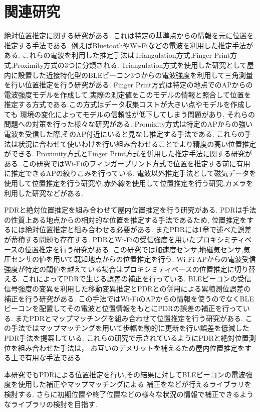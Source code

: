 

\section{関連研究}
絶対位置推定に関する研究がある.
これは特定の基準点からの情報を元に位置を推定する手法である.
例えばBluetoothやWi-Fiなどの電波を利用した推定手法がある.
これらの電波を利用した推定手法はTriangulation方式,Finger Print方式,Proximity方式の3つに分類される.\cite{wireless-lan-summary}
Triangulation方式を使用した研究として屋内に設置した近接特化型のBLEビーコン3つからの電波強度を利用して三角測量を行い位置推定を行う研究がある.\cite{ble-indoor}\cite{ble-tandem}\cite{triangulation-kalman}
Finger Print方式は特定の地点でのAPからの電波強度モデルを作成して,実際の測定値をこのモデルの情報と照合して位置を推定する方式である.この方式はデータ収集コストが大きい点やモデルを作成しても
環境の変化によってモデルの信頼性が低下してしまう問題があり,
それらの問題への対策を行った様々な研究がある.\cite{gaussian-mixture-model}\cite{wireless-lan-cost-reduction}\cite{fingerprint-auto-update}\cite{wi-fi-fingerprint-domain}
Promixity方式は特定のAPからの強い電波を受信した際,そのAP付近にいると見なし推定する手法である.
これらの手法は状況に合わせて使いわけを行い組み合わせることでより精度の高い位置推定ができる.
Proximity方式とFinger Print方式を併用した推定手法に関する研究がある.\cite{proximity-fingerprint}
この研究ではWi-Fiのフィンガープリント方式で位置を推定する前に有用に推定できるAPの絞りこみを行っている.
電波以外推定手法として磁気データを使用して位置推定を行う研究\cite{pdr-mag}や,赤外線を使用して位置推定を行う研究\cite{infrared},カメラを
利用した研究\cite{camera}などがある.

PDRと絶対位置推定を組み合わせて屋内位置推定を行う研究がある.
PDRは手法の性質上ある地点からの相対的な位置を推定する手法であるため,
位置推定をするには絶対位置推定と組み合わせる必要がある.
またPDRには1章で述べた誤差が蓄積する問題も存在する.
PDRとWi-Fiの受信強度を用いたプロキシミティベースの位置推定を行う研究\cite{pdr-wifi}がある.
この研究では加速度センサ,地磁気センサ,気圧センサの値を用いて既知地点からの位置推定を行う.
Wi-Fi APからの電波受信強度が特定の閾値を越えている場合はプロキシミティベースの位置推定に切り替える.
これによってPDRで生じる誤差の補正を行っている.
BLEビーコンの受信信号強度の変異を利用した移動変異推定とPDRとの併用による累積測位誤差の補正を行う研究\cite{pdr-ble}がある.
この手法ではWi-FiのAPからの情報を使うのでなくBLEビーコンを配置してその電波と位置情報をもとにPDRの誤差の補正を行っている.
またPDRとマップマッチングを組み合わせて位置推定を行う研究\cite{pdr-map}がある.
この手法ではマップマッチングを用いて歩幅を動的に更新を行い誤差を低減したPDR手法を提案している.
これらの研究で示されているようにPDRと絶対位置測位を組み合わせた手法は，
お互いのデメリットを補えるため屋内位置推定をする上で有用な手法である.

本研究でもPDRによる位置推定を行い,その結果に対してBLEビーコンの電波強度を使用した補正やマップマッチングによる
補正をなどが行えるライブラリを検討する.
さらに初期位置や終了位置などの様々な状況の情報で補正できるようなライブラリの検討を目指す.










